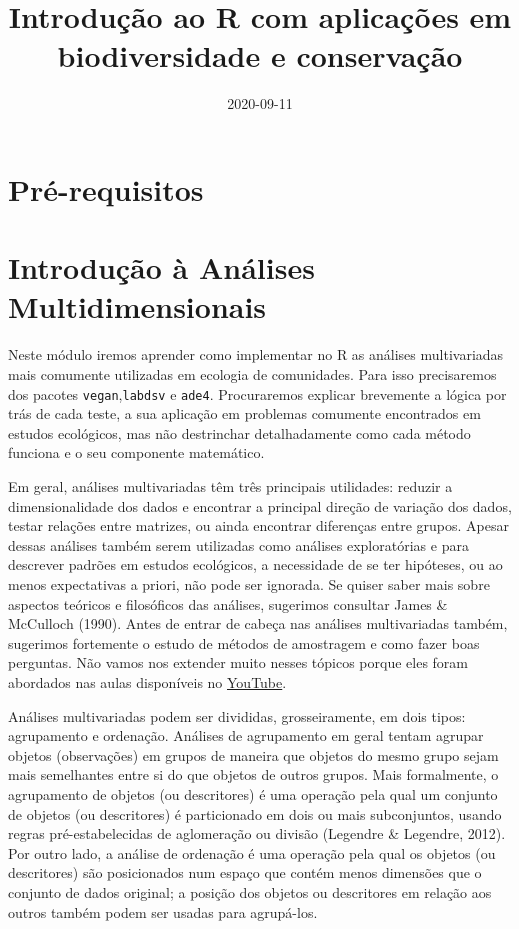 \documentclass[
]{book}
\title{Introdução ao R com aplicações em biodiversidade e conservação}
\author{}
\date{\vspace{-2.5em}2020-09-11}
\begin{document}
\maketitle

{
\setcounter{tocdepth}{1}
\tableofcontents
}
\hypertarget{pruxe9-requisitos}{%
\chapter{Pré-requisitos}\label{pruxe9-requisitos}}

\hypertarget{introduuxe7uxe3o-uxe0-anuxe1lises-multidimensionais}{%
\chapter{Introdução à Análises Multidimensionais}\label{introduuxe7uxe3o-uxe0-anuxe1lises-multidimensionais}}

Neste módulo iremos aprender como implementar no R as análises multivariadas mais comumente utilizadas em ecologia de comunidades. Para isso precisaremos dos pacotes \texttt{vegan},\texttt{labdsv} e \texttt{ade4}. Procuraremos explicar brevemente a lógica por trás de cada teste, a sua aplicação em problemas comumente encontrados em estudos ecológicos, mas não destrinchar detalhadamente como cada método funciona e o seu componente matemático.

Em geral, análises multivariadas têm três principais utilidades: reduzir a dimensionalidade dos dados e encontrar a principal direção de variação dos dados, testar relações entre matrizes, ou ainda encontrar diferenças entre grupos. Apesar dessas análises também serem utilizadas como análises exploratórias e para descrever padrões em estudos ecológicos, a necessidade de se ter hipóteses, ou ao menos expectativas a priori, não pode ser ignorada. Se quiser saber mais sobre aspectos teóricos e filosóficos das análises, sugerimos consultar James \& McCulloch (1990). Antes de entrar de cabeça nas análises multivariadas também, sugerimos fortemente o estudo de métodos de amostragem e como fazer boas perguntas. Não vamos nos extender muito nesses tópicos porque eles foram abordados nas aulas disponíveis no \href{https://www.youtube.com/playlist?list=PLy2rjqiD2VP5G6pqMo_QlWo7I3yu-uFTk}{YouTube}.

Análises multivariadas podem ser divididas, grosseiramente, em dois tipos: agrupamento e ordenação. Análises de agrupamento em geral tentam agrupar objetos (observações) em grupos de maneira que objetos do mesmo grupo sejam mais semelhantes entre si do que objetos de outros grupos. Mais formalmente, o agrupamento de objetos (ou descritores) é uma operação pela qual um conjunto de objetos (ou descritores) é particionado em dois ou mais subconjuntos, usando regras pré-estabelecidas de aglomeração ou divisão (Legendre \& Legendre, 2012). Por outro lado, a análise de ordenação é uma operação pela qual os objetos (ou descritores) são posicionados num espaço que contém menos dimensões que o conjunto de dados original; a posição dos objetos ou descritores em relação aos outros também podem ser usadas para agrupá-los.
\end{document}
